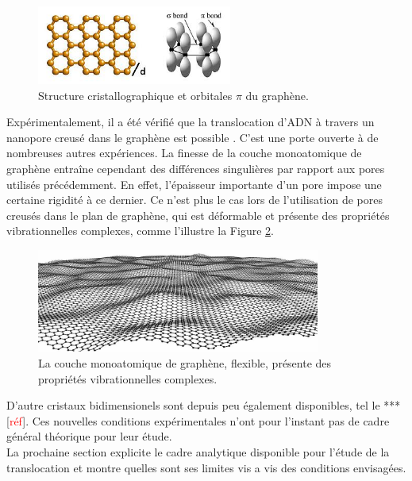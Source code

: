 \documentclass[a4paper,11pt]{article}
\begin{document}
\begin{figure}[H]
\begin{center}
\includegraphics[width=0.57\textwidth]{orbitals2.jpg} 
\caption{Structure cristallographique et orbitales $\pi$ du graphène.}
\label{orbit}
\end{center}
\end{figure}
 
Expérimentalement, il a été vérifié que la translocation d'ADN à travers un nanopore creusé dans le graphène est possible \cite{dnatrans}. C'est une porte ouverte à de nombreuses autres expériences. La finesse de la couche monoatomique de graphène entraîne cependant des différences singulières par rapport aux pores utilisés précédemment. En effet, l'épaisseur importante d'un pore impose une certaine rigidité à ce dernier. Ce n'est plus le cas lors de l'utilisation de pores creusés dans le plan de graphène, qui est déformable et présente des propriétés vibrationnelles complexes, comme l'illustre la Figure \ref{vib}.


\begin{figure}[H]
\begin{center}
\includegraphics[width=0.83\textwidth]{vib.jpg} 
\caption{La couche monoatomique de graphène, flexible, présente des propriétés vibrationnelles complexes.}
\label{vib}
\end{center}
\end{figure}

D'autre cristaux bidimensionels sont depuis peu également disponibles, tel le *** [\textcolor{red}{réf}]. Ces nouvelles conditions expérimentales n'ont pour l'instant pas de cadre général théorique pour leur étude.\\

La prochaine section explicite le cadre analytique disponible pour l'étude de la translocation et montre quelles sont ses limites vis a vis des conditions  envisagées.
\end{document}
